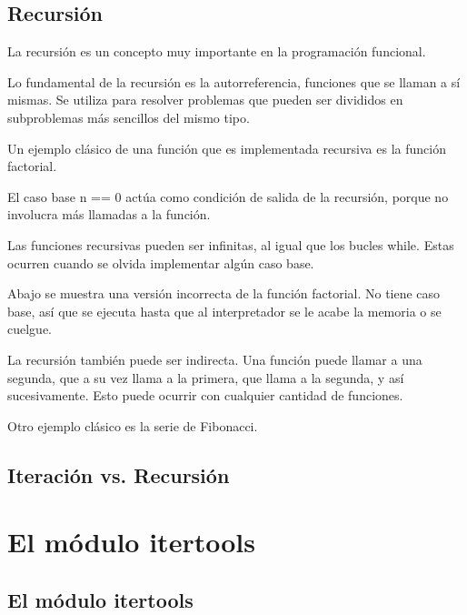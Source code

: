 \documentclass{report}
\begin{document}
{

\section{Recursión}

La recursión es un concepto muy importante en la programación funcional.

Lo fundamental de la recursión es la autorreferencia, funciones que se llaman a sí mismas. Se utiliza para resolver problemas que pueden ser divididos en subproblemas más sencillos del mismo tipo.

Un ejemplo clásico de una función que es implementada recursiva es la función factorial.


El caso base n == 0 actúa como condición de salida de la recursión, porque no involucra más llamadas a la función.

Las funciones recursivas pueden ser infinitas, al igual que los bucles while. Estas ocurren cuando se olvida implementar algún caso base.

Abajo se muestra una versión incorrecta de la función factorial. No tiene caso base, así que se ejecuta hasta que al interpretador se le acabe la memoria o se cuelgue.


La recursión también puede ser indirecta. Una función puede llamar a una segunda, que a su vez llama a la primera, que llama a la segunda, y así sucesivamente. Esto puede ocurrir con cualquier cantidad de funciones.


Otro ejemplo clásico es la serie de Fibonacci.


\section{Iteración vs. Recursión}

\clearpage\chapter{El módulo itertools}

\section{El módulo itertools}

}
\end{document}
